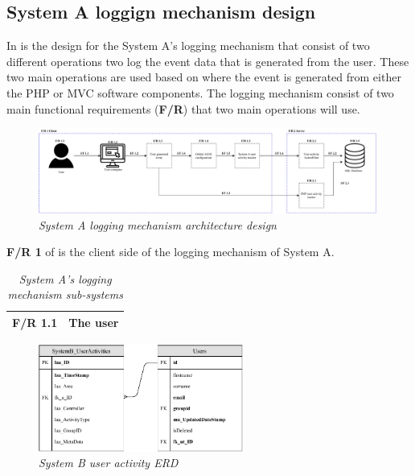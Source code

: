 \subsection{System A loggign mechanism design}

In  is the design for the System A's logging mechanism that consist of two different operations two log the event data that is generated from the user. These two main operations are used based on where the event is generated from either the PHP or MVC software components. The logging mechanism consist of two main functional requirements (\textbf{F/R}) that two main operations will use.

\begin{figure}[!htb] %
	\centering %
	\includegraphics[width=0.99\textwidth]{Images/Chapter2/SystemA_Architecture_Diagram/SystemA_Architecture_Diagram.pdf}
	\caption[System A logging mechanism architecture design]
	{\textit{System A logging mechanism architecture design}}\label{fig:SystemA_Arch_Design}
\end{figure}

\textbf{F/R 1} of  is the client side of the logging mechanism of System A.

\begin{table}[!htb]
	\centering
	\small
	\caption[System A's logging mechanism sub-systems]
	{\textit{System A's logging mechanism sub-systems}}
	\label{tbl:SystemA_SubSystems}
	\begin{tabularx}{\textwidth}{|l|X|}
		\hline \textbf{F/R 1.1} & The user \\
		\hline
	\end{tabularx}
\end{table}

\clearpage

\begin{figure}[!htb] %
	\centering %
	\includegraphics[width=0.6\textwidth]{Images/Chapter2/SystemB_ERD_Basic/SystemB_ERD_Basic.pdf}
	\caption[System B user activity ERD]
	{\textit{System B user activity ERD}}\label{fig:SystemB_Basic_ERD}
\end{figure}

